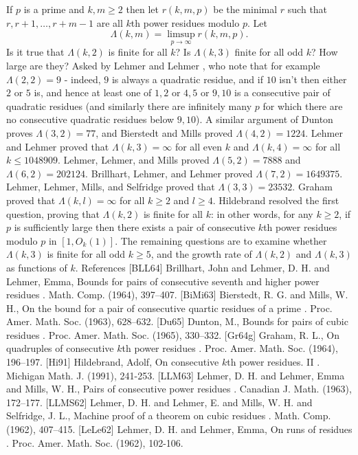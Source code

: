 If $p$ is a prime and $k,m\geq 2$ then let $r(k,m,p)$ be the minimal $r$ such that $r,r+1,\ldots,r+m-1$ are all $k$th power residues modulo $p$. Let\[\Lambda(k,m)=\limsup_{p\to \infty} r(k,m,p).\]Is it true that $\Lambda(k,2)$ is finite for all $k$? Is $\Lambda(k,3)$ finite for all odd $k$? How large are they? Asked by Lehmer and Lehmer \cite{LeLe62}, who note that for example $\Lambda(2,2)=9$ - indeed, $9$ is always a quadratic residue, and if $10$ isn't then either $2$ or $5$ is, and hence at least one of $1,2$ or $4,5$ or $9,10$ is a consecutive pair of quadratic residues (and similarly there are infinitely many $p$ for which there are no consecutive quadratic residues below $9,10$). A similar argument of Dunton \cite{Du65} proves $\Lambda(3,2)=77$, and Bierstedt and Mills \cite{BiMi63} proved $\Lambda(4,2)=1224$. Lehmer and Lehmer proved that $\Lambda(k,3)=\infty$ for all even $k$ and $\Lambda(k,4)=\infty$ for all $k\leq 1048909$. Lehmer, Lehmer, and Mills \cite{LLM63} proved $\Lambda(5,2)=7888$ and $\Lambda(6,2)=202124$. Brillhart, Lehmer, and Lehmer \cite{BLL64} proved $\Lambda(7,2)=1649375$. Lehmer, Lehmer, Mills, and Selfridge \cite{LLMS62} proved that $\Lambda(3,3)=23532$. Graham \cite{Gr64g} proved that $\Lambda(k,l)=\infty$ for all $k\geq 2$ and $l\geq 4$. Hildebrand \cite{Hi91} resolved the first question, proving that $\Lambda(k,2)$ is finite for all $k$: in other words, for any $k\geq 2$, if $p$ is sufficiently large then there exists a pair of consecutive $k$th power residues modulo $p$ in $[1,O_k(1)]$. The remaining questions are to examine whether $\Lambda(k,3)$ is finite for all odd $k\geq 5$, and the growth rate of $\Lambda(k,2)$ and $\Lambda(k,3)$ as functions of $k$. References [BLL64] Brillhart, John and Lehmer, D. H. and Lehmer, Emma, Bounds for pairs of consecutive seventh and higher power residues . Math. Comp. (1964), 397--407. [BiMi63] Bierstedt, R. G. and Mills, W. H., On the bound for a pair of consecutive quartic residues of a prime . Proc. Amer. Math. Soc. (1963), 628--632. [Du65] Dunton, M., Bounds for pairs of cubic residues . Proc. Amer. Math. Soc. (1965), 330--332. [Gr64g] Graham, R. L., On quadruples of consecutive {$k$}th power residues . Proc. Amer. Math. Soc. (1964), 196--197. [Hi91] Hildebrand, Adolf, On consecutive {$k$}th power residues. II . Michigan Math. J. (1991), 241-253. [LLM63] Lehmer, D. H. and Lehmer, Emma and Mills, W. H., Pairs of consecutive power residues . Canadian J. Math. (1963), 172--177. [LLMS62] Lehmer, D. H. and Lehmer, E. and Mills, W. H. and Selfridge, J. L., Machine proof of a theorem on cubic residues . Math. Comp. (1962), 407--415. [LeLe62] Lehmer, D. H. and Lehmer, Emma, On runs of residues . Proc. Amer. Math. Soc. (1962), 102-106.



